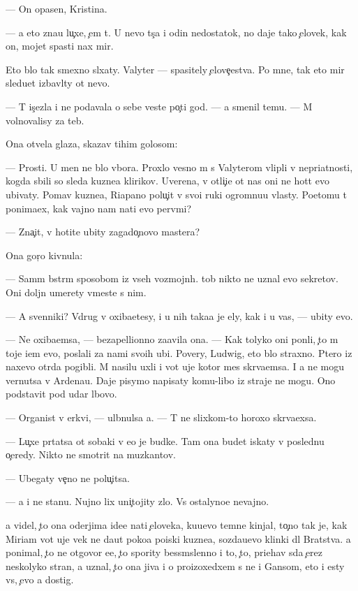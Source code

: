 \documentclass[10pt]{book}
\begin{document}
— On opasen, Kristina.

— {\Y}a eto zna{\y}u lu{\c}xe, {\c}em t{\yi}. U nevo t{\yi}s{\ia}{\c}a i odin nedostatok, no daje tako{\y} {\c}elovek, kak on, mojet spasti nax mir.

Eto b{\yi}lo tak smexno sl{\yi}xaty. Valyter — spasitely {\c}elove{\c}estva. Po mne, tak eto mir sledu{\y}et izbavl{\ia}ty ot nevo.

— T{\yi} is{\c}ezla i ne podavala o sebe veste{\y} po{\c}ti god. — {\Y}a smenil temu. — M{\yi} volnovalisy za teb{\ia}.

Ona otvela glaza, skazav tihim golosom:

— Prosti. U men{\ia} ne b{\yi}lo v{\yi}bora. Proxlo{\y} vesno{\y} m{\yi} s Valyterom vlipli v nepri{\y}atnosti, kogda sbili so sleda kuzne{\q}a klirikov. Uverena, v otli{\c}i{\y}e ot nas oni ne hot{\ia}t {\y}evo ubivaty. Po{\y}mav kuzne{\q}a, Riapano polu{\c}it v svo{\y}i ruki ogromnu{\y}u vlasty. Poetomu t{\yi} ponima{\y}ex, kak vajno nam na{\y}ti {\y}evo perv{\yi}mi?

— Zna{\c}it, v{\yi} hotite ubity zagado{\c}novo mastera?

Ona gor{\ia}{\c}o kivnula:

— Sam{\yi}m b{\yi}str{\yi}m sposobom iz vseh vozmojn{\yi}h. {\C}tob{\yi} nikto ne uznal {\y}evo sekretov. Oni doljn{\yi} umerety vmeste s nim.

— A sv{\ia}{\x}enniki? Vdrug v{\yi} oxiba{\y}etesy, i u nih taka{\y}a je {\q}ely, kak i u vas, — ubity {\y}evo.

— Ne oxiba{\y}emsa, — bezapell{\ia}{\q}ionno za{\y}avila ona. — Kak tolyko oni pon{\ia}li, {\c}to m{\yi} toje i{\x}em {\y}evo, poslali za nami svo{\y}ih ubi{\y}{\q}. Povery, Ludwig, eto b{\yi}lo straxno. P{\ia}tero iz naxevo otr{\ia}da pogibli. M{\yi} nasilu uxli i vot uje kotor{\yi}{\y} mes{\ia}{\q} skr{\yi}va{\y}emsa. I {\y}a ne mogu vernutsa v Ardenau. Daje pisymo napisaty komu-libo iz straje{\y} ne mogu. Ono podstavit pod udar l{\iu}bovo.

— Organist v {\q}erkvi, — ul{\yi}bnulsa {\y}a. — T{\yi} ne slixkom-to horoxo skr{\yi}va{\y}exsa.

— Lu{\c}xe pr{\ia}tatsa ot sobaki v {\y}e{\y}o je budke. Tam ona budet iskaty v posledn{\iu}{\y}u o{\c}eredy. Nikto ne smotrit na muz{\yi}kantov.

— Ubegaty ve{\c}no ne polu{\c}itsa.

— {\Y}a i ne stanu. Nujno lix uni{\c}tojity zlo. Vs{\e} ostalyno{\y}e nevajno.

{\Y}a videl, {\c}to ona oderjima ide{\y}e{\y} na{\y}ti {\c}eloveka, ku{\y}u{\x}evo temn{\yi}{\y}e kinjal{\yi}, to{\c}no tak je, kak Miriam vot uje vek ne da{\y}ut poko{\y}a po{\y}iski kuzne{\q}a, sozda{\y}u{\x}evo klinki dl{\ia} Bratstva. {\Y}a ponimal, {\c}to ne otgovor{\iu} {\y}e{\y}e, {\c}to spority bessm{\yi}slenno i to, {\c}to, pri{\y}ehav s{\iu}da {\c}erez neskolyko stran, {\y}a uznal, {\c}to ona jiva i o pro{\y}izoxedxem s ne{\y} i Gansom, eto i {\y}esty vs{\e}, {\c}evo {\y}a dostig.
\end{document}

